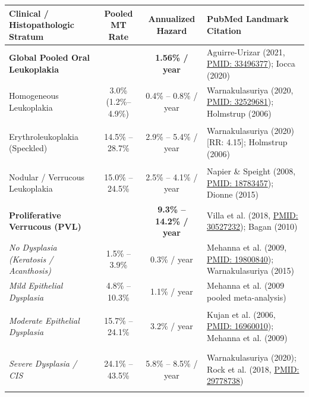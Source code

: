 \documentclass[9pt,a4paper]{article}
\newcommand{\hlg}[1]{\colorbox{hlgray}{\strut #1}}
\newcommand{\hly}[1]{\colorbox{hlyellow}{\strut #1}}
\newcommand{\hlr}[1]{\colorbox{hlred}{\strut\color{darkred}#1}}
\begin{document}
\vspace{1pt}
\begin{center}
\footnotesize
\renewcommand{\arraystretch}{1.12}
\begin{tabularx}{\linewidth}{>{\raggedright\arraybackslash}p{4.3cm} c c >{\raggedright\arraybackslash}X}
\toprule
\textbf{Clinical / Histopathologic Stratum} & \textbf{Pooled MT Rate} & \textbf{Annualized Hazard} & \textbf{PubMed Landmark Citation} \\
\midrule
\textbf{Global Pooled Oral Leukoplakia} & \textbf{\hlg{7.2\% -- 9.5\%}} & \textbf{1.56\% / year} & Aguirre-Urizar (2021, \href{https://pubmed.ncbi.nlm.nih.gov/33496377/}{PMID: 33496377}); Iocca (2020) \\
Homogeneous Leukoplakia & 3.0\% (1.2\%--4.9\%) & 0.4\% -- 0.8\% / year & Warnakulasuriya (2020, \href{https://pubmed.ncbi.nlm.nih.gov/32529681/}{PMID: 32529681}); Holmstrup (2006) \\
Erythroleukoplakia (Speckled) & \hly{14.5\% -- 28.7\%} & 2.9\% -- 5.4\% / year & Warnakulasuriya (2020) [RR: 4.15]; Holmstrup (2006) \\
Nodular / Verrucous Leukoplakia & 15.0\% -- 24.5\% & 2.5\% -- 4.1\% / year & Napier \& Speight (2008, \href{https://pubmed.ncbi.nlm.nih.gov/18783457/}{PMID: 18783457}); Dionne (2015) \\
\textbf{Proliferative Verrucous (PVL)} & \textbf{\hlr{49.5\% -- 65.8\%}} & \textbf{9.3\% -- 14.2\% / year} & Villa et al. (2018, \href{https://pubmed.ncbi.nlm.nih.gov/30527232/}{PMID: 30527232}); Bagan (2010) \\
\midrule
\textit{No Dysplasia (Keratosis / Acanthosis)} & 1.5\% -- 3.9\% & 0.3\% / year & Mehanna et al. (2009, \href{https://pubmed.ncbi.nlm.nih.gov/19800840/}{PMID: 19800840}); Warnakulasuriya (2015) \\
\textit{Mild Epithelial Dysplasia} & 4.8\% -- 10.3\% & 1.1\% / year & Mehanna et al. (2009 pooled meta-analysis) \\
\textit{Moderate Epithelial Dysplasia} & \hly{15.7\% -- 24.1\%} & 3.2\% / year & Kujan et al. (2006, \href{https://pubmed.ncbi.nlm.nih.gov/16960010/}{PMID: 16960010}); Mehanna et al. (2009) \\
\textit{Severe Dysplasia / CIS} & \hlr{24.1\% -- 43.5\%} & 5.8\% -- 8.5\% / year & Warnakulasuriya (2020); Rock et al. (2018, \href{https://pubmed.ncbi.nlm.nih.gov/29778738/}{PMID: 29778738}) \\
\bottomrule
\end{tabularx}
\end{center}
\end{document}

